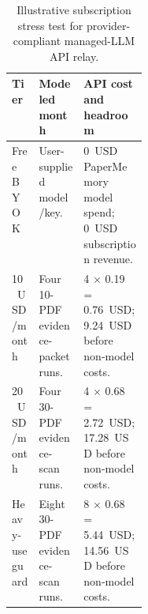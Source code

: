 \begin{table}[t]
  \caption{Illustrative subscription stress test for provider-compliant managed-LLM API relay.}
  \label{tab:tier-economics}
  \centering
  \small
  \setlength{\tabcolsep}{3pt}
  \begin{tabularx}{\linewidth}{p{0.2\linewidth}YY}
    \toprule
    Tier & Modeled month & API cost and headroom \\
    \midrule
    Free BYOK & User-supplied model/key. & 0~USD PaperMemory model spend; 0~USD subscription revenue. \\
    10~USD/month & Four 10-PDF evidence-packet runs. & 4 $\times$ 0.19 = 0.76~USD; 9.24~USD before non-model costs. \\
    20~USD/month & Four 30-PDF evidence-scan runs. & 4 $\times$ 0.68 = 2.72~USD; 17.28~USD before non-model costs. \\
    Heavy-use guard & Eight 30-PDF evidence-scan runs. & 8 $\times$ 0.68 = 5.44~USD; 14.56~USD before non-model costs. \\
    \bottomrule
  \end{tabularx}
\end{table}
